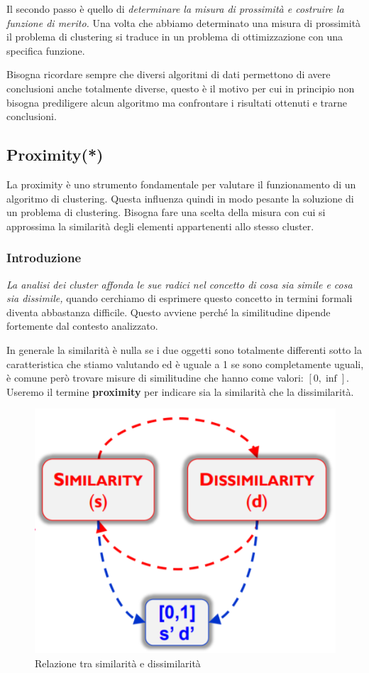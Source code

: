 Il secondo passo è quello di \textit{determinare la misura di prossimità e costruire la funzione di merito.} Una volta che abbiamo determinato una misura di prossimità il problema di clustering si traduce in un problema di ottimizzazione con una specifica funzione.

Bisogna ricordare sempre che diversi algoritmi di dati permettono di avere conclusioni anche totalmente diverse, questo è il motivo per cui in principio non bisogna prediligere alcun algoritmo ma confrontare i risultati ottenuti e trarne conclusioni.


\subsection{Proximity(*)}

La proximity è uno strumento fondamentale per valutare il funzionamento di un algoritmo di clustering. Questa influenza quindi in modo pesante la soluzione di un problema di clustering. Bisogna fare una scelta della misura con cui si approssima la similarità degli elementi appartenenti allo stesso cluster.
\subsubsection{Introduzione}
\textit{La analisi dei cluster affonda le sue radici nel concetto di cosa sia simile e cosa sia dissimile,} quando cerchiamo di esprimere questo concetto  in termini formali diventa abbastanza difficile. Questo avviene perché la similitudine dipende fortemente dal contesto analizzato.

In generale la similarità è nulla se i due oggetti sono totalmente differenti sotto la caratteristica che stiamo valutando ed è uguale a 1 se sono completamente uguali, è comune però trovare misure di similitudine che hanno come valori:  $[0,\inf]$. Useremo il termine \textbf{proximity} per indicare sia la similarità che la dissimilarità. 

\begin{figure}[H]
	\centering
	\includegraphics[height=0.45 \linewidth]{clustering/pict/simil_diss.png}
	\caption{Relazione tra similarità e dissimilarità}
\end{figure}

